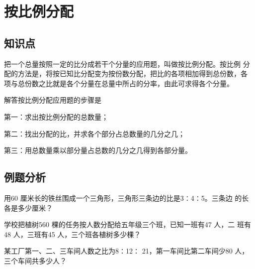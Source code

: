 \chapter{按比例分配}
\section{知识点}
把一个总量按照一定的比分成若干个分量的应用题，叫做按比例分配。按比例
分配的方法是，将按已知比分配变为按份数分配，把比的各项相加得到总份数，各
项与总份数之比就是各个分量在总量中所占的分率，由此可求得各个分量。\par
解答按比例分配应用题的步骤是\par
第一：求出按比例分配的总数量；\par
第二：找出分配的比，并求各个部分占总数量的几分之几；\par 
第三：用总数量乘以部分量占总数的几分之几得到各部分量。
\section{例题分析}
\begin{example}
    用60 厘米长的铁丝围成一个三角形，三角形三条边的比是3∶4∶5。三条边
    的长各是多少厘米？ 
\end{example}
\vspace{3cm}
\begin{example}
    学校把植树560 棵的任务按人数分配给五年级三个班，已知一班有47 人，二
班有48 人，三班有45 人，三个班各植树多少棵？
\end{example}
\vspace{3cm}
\begin{example}
    某工厂第一、二、三车间人数之比为8∶12∶ 21，第一车间比第二车间少80
人，三个车间共多少人？
\end{example}
\vspace{3cm}
